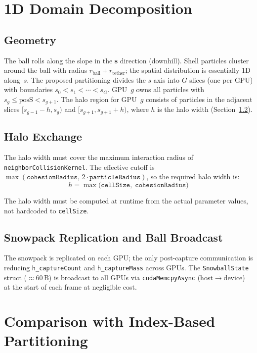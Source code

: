 \documentclass[conference]{IEEEtran}
\begin{document}
\section{1D Domain Decomposition}
\label{sec:decomp}

\subsection{Geometry}

The ball rolls along the slope in the \textbf{s} direction (downhill). Shell
particles cluster around the ball with radius $r_\text{ball} + r_\text{tether}$;
the spatial distribution is essentially 1D along~$s$. The proposed
partitioning divides the $s$ axis into $G$ slices (one per GPU) with
boundaries $s_0 < s_1 < \cdots < s_G$. GPU~$g$ owns all particles with
$s_g \le \text{posS} < s_{g+1}$. The halo region for GPU~$g$ consists of particles in the adjacent
slices $[s_{g-1} - h, s_g)$ and $[s_{g+1}, s_{g+1} + h)$, where $h$ is the halo width (Section~\ref{sec:halo}).

\subsection{Halo Exchange}
\label{sec:halo}

The halo width must cover the maximum interaction radius of
\texttt{neighborCollisionKernel}. The effective cutoff is $\max(\texttt{cohesionRadius},\,2\cdot
\texttt{particleRadius})$, so the required halo width is:
\[
  h = \max\!\bigl(\texttt{cellSize},\;\texttt{cohesionRadius}\bigr)
\]

The halo width must be computed at runtime from the actual
parameter values, not hardcoded to \texttt{cellSize}.

\subsection{Snowpack Replication and Ball Broadcast}

The snowpack is replicated on each GPU; the only post-capture 
communication is reducing \texttt{h\_captureCount} and \texttt{h\_captureMass} across GPUs.
The \texttt{SnowballState} struct ($\approx 60$\,B) is broadcast to all
GPUs via \texttt{cudaMemcpyAsync} (host$\to$device) at the start of each
frame at negligible cost.

\section{Comparison with Index-Based Partitioning}
\label{sec:index}
\end{document}
